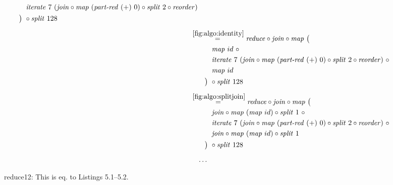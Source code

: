 \begin{figure*}[t]
\begin{align*}
\begin{aligned}
    &\qquad\quad\iterateN\ 7\ (\join \circ \map\ (\partRed\ (+)\ 0) \circ \splitN\ 2\circ \reorder)\\
    &\qquad\big)\ \circ \splitN\ 128
  \end{aligned}\\[.5em]
%
  &\hspace{-2em}\quad\begin{aligned}
    &\overset{\ref{fig:algo:identity}}{=\hspace{.2em}}
      \reduce \circ \join \circ \map\ \big(\\
    &\qquad\quad\map\ id\ \circ \\
    &\qquad\quad\iterateN\ 7\ (\join \circ \map\ (\partRed\ (+)\ 0) \circ \splitN\ 2\circ \reorder)\ \circ\\
    &\qquad\quad\map\ id\\
    &\qquad\big)\ \circ \splitN\ 128
  \end{aligned}\\[.5em]
%
  &\hspace{-2em}\quad\begin{aligned}
    &\overset{\ref{fig:algo:splitjoin}}{=\hspace{.2em}}
      \reduce \circ \join \circ \map\ \big(\\
    &\qquad\quad\join \circ \map\ (\map\ id) \circ \splitN\ 1\ \circ\\
    &\qquad\quad\iterateN\ 7\ (\join \circ \map\ (\partRed\ (+)\ 0) \circ \splitN\ 2\circ \reorder)\ \circ\\
    &\qquad\quad\join \circ \map\ (\map\ id) \circ \splitN\ 1\\
    &\qquad\big)\ \circ \splitN\ 128
  \end{aligned}\\[.5em]
%
  &\ldots
\end{align*}
\caption{reduce12: This is eq. to Listings 5.1--5.2.}
\end{figure*}

